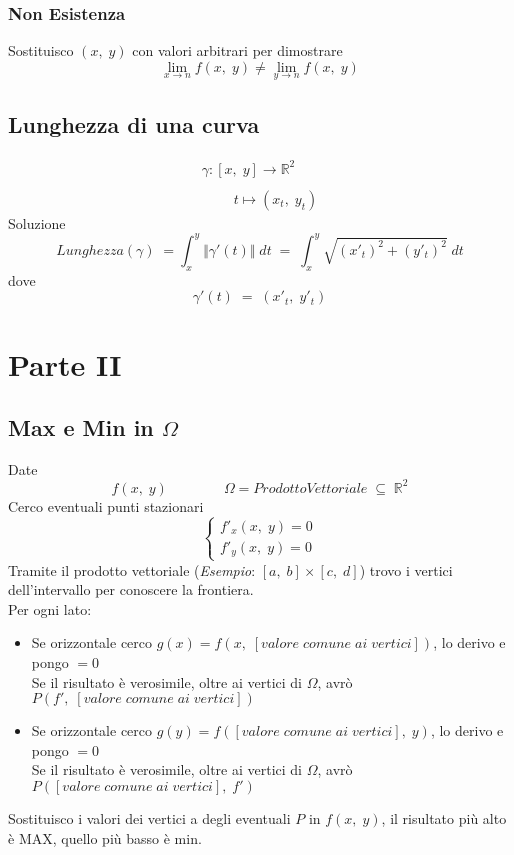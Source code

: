 \documentclass[a4paper, 10pt]{article}
\begin{document}
 				\subsubsection{Non Esistenza}
 					Sostituisco $ (x,\; y) $ con valori arbitrari per dimostrare
 						\[
	 						\lim_{x \to n} f(x,\; y) \neq \lim_{y \to n} f(x,\; y)
 						\]
 						
			\subsection{Lunghezza di una curva}
					\[
						\begin{array}{l}
							\gamma : [x,\; y] \rightarrow \mathbb{R}^2 \\
							\\
							\quad\quad\; t \mapsto (x_t,\; y_t)
						\end{array}
					\]
				Soluzione
					\[
						\mathit{Lunghezza}(\gamma)\; = \int_{x}^{y} \Vert \gamma'(t) \Vert\; dt\; =\; \int_{x}^{y} \sqrt{(x'_t)^2 + (y'_t)^2}\; dt
					\]
				dove
					\[
						\gamma'(t)\; =\; (x'_t,\; y'_t)
					\]
				\newpage
			
		\section{Parte II}
			\subsection{Max e Min in $\Omega$}
				Date
					\[
						f(x,\; y)\quad\quad\quad\quad \Omega = Prodotto Vettoriale\; \subseteq\; \mathbb{R}^2
					\] 
				Cerco eventuali punti stazionari
					\[
						\begin{cases}
							f'_x(x,\; y) = 0 \\
							f'_y(x,\; y) = 0 
 						\end{cases}
					\]
				Tramite il prodotto vettoriale (\textit{Esempio}: $ [a,\; b] \times [c,\; d] $) trovo i vertici dell'intervallo per conoscere la frontiera.\\
				Per ogni lato:
					\begin{itemize}
						\item Se orizzontale cerco $ g(x) = f(x,\; [valore\; comune\; ai\; vertici]) $, lo derivo e pongo $ =0 $\\ Se il risultato è verosimile, oltre ai vertici di $\Omega$, avrò $ P(f',\; [valore\; comune\; ai\; vertici]) $
						\item Se orizzontale cerco $ g(y) = f([valore\; comune\; ai\; vertici],\; y) $, lo derivo e pongo $ =0 $\\ 
						Se il risultato è verosimile, oltre ai vertici di $\Omega$, avrò $ P([valore\; comune\; ai\; vertici],\; f') $
					\end{itemize}
				Sostituisco i valori dei vertici a degli eventuali $ P $ in $ f(x,\; y) $, il risultato più alto è MAX, quello più basso è min.
\end{document}
